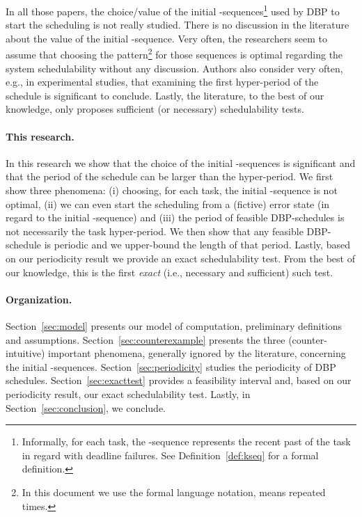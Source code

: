 \documentclass{article}
\begin{document}
In all those papers, the choice/value of the initial -sequences\footnote{Informally, for each task, the -sequence represents the recent past of the task in regard with deadline failures. See Definition~\ref{def:kseq} for a formal definition.} used by DBP to start the scheduling is not really studied. There is no discussion in the literature about the value of the initial -sequence. Very often, the researchers seem to assume that choosing the pattern\footnote{In this document we use the formal language notation,  means  repeated  times.}  for those sequences is optimal regarding the system schedulability without any discussion. Authors also consider very often, e.g., in experimental studies, that examining the first hyper-period of the schedule is significant to conclude. Lastly, the literature, to the best of our knowledge, only proposes sufficient (or necessary) schedulability tests.

\paragraph{This research.} In this research we show that the choice of the initial -sequences is significant and that the period of the schedule can be larger than the hyper-period.
We first show three phenomena: (i) choosing, for each task, the initial -sequence  is not optimal, (ii)  we can even start the scheduling from a (fictive) error state (in regard to the initial -sequence) and (iii) the period of feasible DBP-schedules is not necessarily the task hyper-period. We then show that any feasible DBP-schedule is periodic and we upper-bound the length of that period. Lastly, based on our periodicity result we provide an exact schedulability test. From the best of our knowledge, this is the first \emph{exact} (i.e., necessary and sufficient) such test. 

\paragraph{Organization.} Section~\ref{sec:model} presents our model of computation, preliminary definitions and assumptions. Section~\ref{sec:counterexample} presents the three (counter-intuitive) important phenomena, generally ignored by the literature, concerning the initial -sequences. Section~\ref{sec:periodicity} studies the periodicity of DBP schedules. Section~\ref{sec:exacttest} provides a feasibility interval and, based on our periodicity result, our exact schedulability test. Lastly, in Section~\ref{sec:conclusion}, we conclude.
\end{document}
